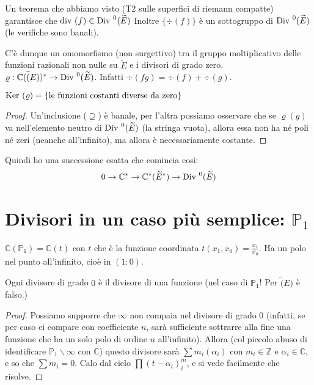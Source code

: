Un teorema che abbiamo visto (T2 sulle superfici di riemann compatte) garantisce che $\mbox{div }(f) \in \mbox{Div }^0(\widetilde{E})$
Inoltre $\{\div(f)\}$ è un sottogruppo di $\mbox{Div }^0(\widetilde{E})$ (le verifiche sono banali).

C'è dunque un omomorfismo (non surgettivo) tra il gruppo moltiplicativo delle funzioni razionali non nulle su $\widetilde{E}$ e i divisori di grado zero.
$\varrho: \mathbb{C}(\widetilde(E))^* \rightarrow \mbox{Div }^0(\widetilde{E})$. Infatti $\div(fg)=\div(f)+\div(g)$.

\begin{proposizione}
$\mbox{Ker }(\varrho) = \{\text{le funzioni costanti diverse da zero}\}$
\end{proposizione}
\begin{proof}
Un'inclusione ($\supseteq$) è banale, per l'altra possiamo osservare che se $\varrho(g)$ va nell'elemento
neutro di $\mbox{Div }^0(\widetilde{E})$ (la stringa vuota), allora essa non ha né poli né zeri (neanche all'infinito), ma allora è necessariamente costante.
\end{proof}

\begin{osservazione}
Quindi ho una successione esatta che comincia così:
$$0 \rightarrow \mathbb{C}^* \rightarrow \mathbb{C}^*(\widetilde{E}^*) \rightarrow \mbox{Div }^0(\widetilde{E})$$
\end{osservazione}


\section{Divisori in un caso più semplice: $\mathbb{P}_1$}
$\mathbb{C}(\mathbb{P}_1) = \mathbb{C}(t)$ con $t$ che è la funzione coordinata $t(x_1, x_0)=\frac{x_1}{x_0}$.
Ha un polo nel punto all'infinito, cioè in $(1:0)$.

\begin{proposizione}
Ogni divisore di grado $0$ è il divisore di una funzione (nel caso di $\mathbb{P}_1$! Per $\widetilde(E)$ è falso.)
\end{proposizione}
\begin{proof}
Possiamo supporre che $\infty$ non compaia nel divisore di grado $0$ (infatti, se per caso ci compare con coefficiente $n$,
sarà sufficiente sottrarre alla fine una funzione che ha un solo polo di ordine $n$ all'infinito).
Allora (col piccolo abuso di identificare $\mathbb{P}_1 \backslash \infty$ con $\mathbb{C}$)
questo divisore sarà $\sum m_i (\alpha_i)$ con $m_i \in \mathbb{Z}$ e $\alpha_i \in \mathbb{C}$, e so che $\sum m_i=0$.
Calo dal cielo $\prod(t-\alpha_i)^m_i$, e si vede facilmente che risolve.
\end{proof}


